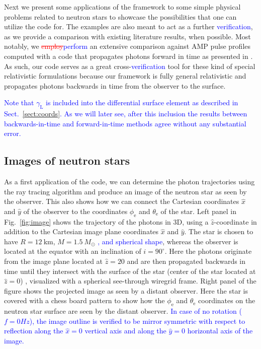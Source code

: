 \documentclass{aa}
\newcommand{\refe}[1]{\textcolor{blue}{{#1}}}
\newcommand{\refedel}[1]{\textcolor{red}{\sout{#1}}}
\newcommand{\Msun}{\ensuremath{M_{\odot}}}
\newcommand{\lgamma}{\gamma_{\text{L}}}
\begin{document}
Next we present some applications of the framework to some simple physical problems related to neutron stars to showcase the possibilities that one can utilize the code for.
The examples are also meant to act as a further \refe{verification}, as we provide a comparison with existing literature results, when possible.
Most notably, we \refedel{employ}\refe{perform} an extensive comparison against AMP pulse profiles computed with a code that propagates photons forward in time as presented in \citet{PB06}.
As such, our code serves as a great cross-\refe{verification} tool for these kind of special relativistic formulations because our framework is fully general relativistic and propagates photons backwards in time from the observer to the surface.

\refe{Note that $\lgamma$ is included into the differential surface element as described in Sect.~\ref{sect:coords}.}
\refe{As we will later see, after this inclusion the results between backwards-in-time and forward-in-time methods agree without any substantial error.}



\subsection{Images of neutron stars}

As a first application of the code, we can determine the photon trajectories using the ray tracing algorithm and produce an image of the neutron star as seen by the observer.
This also shows how we can connect the Cartesian coordinates $\hat{x}$ and $\hat{y}$ of the observer to the coordinates $\phi_{\mathrm{e}}$ and $\theta_{\mathrm{e}}$ of the star.
Left panel in Fig.~\ref{fig:image} shows the trajectory of the photons in 3D, using a $\hat{z}$-coordinate in addition to the Cartesian image plane coordinates $\hat{x}$ and $\hat{y}$.
The star is chosen to have $R=12~\mathrm{km}$, $M=1.5~\Msun$ \refe{, and spherical shape}, whereas the observer is located at the equator with an inclination of $i = 90^{\circ}$.
Here the photons originate from the image plane located at $\hat{z} = 20$ and are then propagated backwards in time until they intersect with the surface of the star (center of the star located at $\hat{z} = 0$) , visualized with a spherical see-through wiregrid frame.
Right panel of the figure shows the projected image as seen by a distant observer.
Here the star is covered with a chess board pattern to show how the $\phi_{\mathrm{e}}$ and $\theta_{\mathrm{e}}$ coordinates on the neutron star surface are seen by the distant observer.
\refe{In case of no rotation ($f = 0 Hz$), the image outline is verified to be mirror symmetric with respect to reflection along the $\hat{x} = 0$ vertical axis and along the $\hat{y} = 0$ horizontal axis of the image.}
\end{document}
